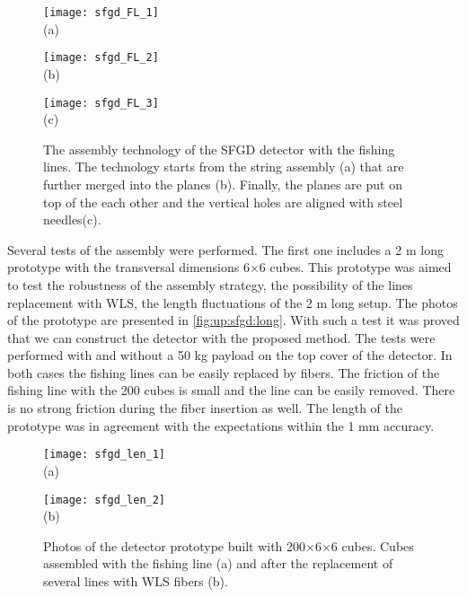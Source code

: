 \documentclass[main.tex]{subfiles}
\begin{document}
\begin{figure}[!ht]
	\centering
  \begin{minipage}{0.33\linewidth}
    \centering
    \texttt{[image: sfgd\_FL\_1]} \\ (a)
  \end{minipage}
  \begin{minipage}{0.33\linewidth}
    \centering
    \texttt{[image: sfgd\_FL\_2]} \\ (b)
  \end{minipage}
  \begin{minipage}{0.33\linewidth}
    \centering
    \texttt{[image: sfgd\_FL\_3]} \\ (c)
  \end{minipage}
  \caption{The assembly technology of the SFGD detector with the fishing lines. The technology starts from the string assembly (a) that are further merged into the planes (b). Finally, the planes are put on top of the each other and the vertical holes are aligned with steel needles(c).}
  \label{fig:up:sfgd:string}
\end{figure}

Several tests of the assembly were performed. The first one includes a 2 m long prototype with the transversal dimensions 6$\times$6 cubes. This prototype was aimed to test the robustness of the assembly strategy, the possibility of the lines replacement with WLS, the length fluctuations of the 2 m long setup. The photos of the prototype are presented in \autoref{fig:up:sfgd:long}. With such a test it was proved that we can construct the detector with the proposed method. The tests were performed with and without a 50 kg payload on the top cover of the detector. In both cases the fishing lines can be easily replaced by fibers. The friction of the fishing line with the 200 cubes is small and the line can be easily removed. There is no strong friction during the fiber insertion as well. The length of the prototype was in agreement with the expectations within the 1 mm accuracy.

\begin{figure}[!ht]
	\centering
  \begin{minipage}{0.49\linewidth}
    \centering
    \texttt{[image: sfgd\_len\_1]} \\ (a)
  \end{minipage}
  \begin{minipage}{0.49\linewidth}
    \centering
    \texttt{[image: sfgd\_len\_2]} \\ (b)
  \end{minipage}
  \caption{Photos of the detector prototype built with 200$\times$6$\times$6 cubes. Cubes assembled with the fishing line (a) and after the replacement of several lines with WLS fibers (b).}
  \label{fig:up:sfgd:long}
\end{figure}
\end{document}
